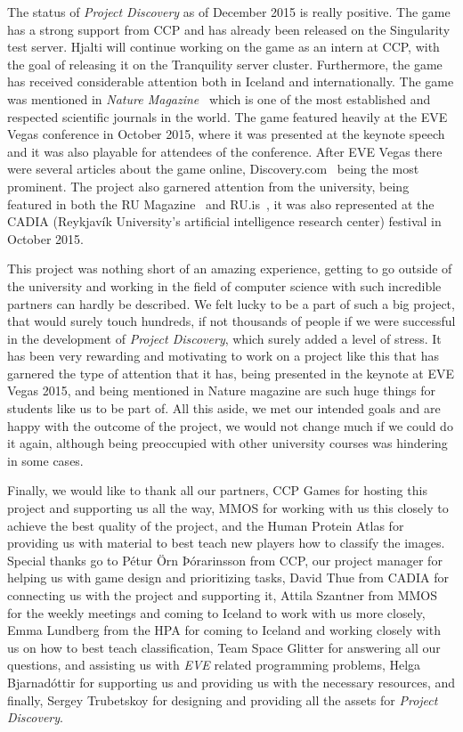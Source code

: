 The status of \emph{Project Discovery} as of December 2015 is really positive. The game has a strong support from CCP and has already been released on the Singularity test server. Hjalti will continue working on the game as an intern at CCP, with the goal of releasing it on the Tranquility server cluster. Furthermore, the game has received considerable attention both in Iceland and internationally. The game was mentioned in \emph{Nature Magazine}~\cite{nature} which is one of the most established and respected scientific journals in the world. The game featured heavily at the EVE Vegas conference in October 2015, where it was presented at the keynote speech and it was also playable for attendees of the conference. After EVE Vegas there were several articles about the game online, Discovery.com~\cite{discovery} being the most prominent. The project also garnered attention from the university, being featured in both the RU Magazine~\cite{rumag} and RU.is~\cite{ruis}, it was also represented at the CADIA (Reykjavík University's artificial intelligence research center) festival in October 2015. 

This project was nothing short of an amazing experience, getting to go outside of the university and working in the field of computer science with such incredible partners can hardly be described. We felt lucky to be a part of such a big project, that would surely touch hundreds, if not thousands of people if we were successful in the development of \emph{Project Discovery}, which surely added a level of stress. It has been very rewarding and motivating to work on a project like this that has garnered the type of attention that it has, being presented in the keynote at EVE Vegas 2015, and being mentioned in Nature magazine are such huge things for students like us to be part of. All this aside, we met our intended goals and are happy with the outcome of the project, we would not change much if we could do it again, although being preoccupied with other university courses was hindering in some cases.

Finally, we would like to thank all our partners, CCP Games for hosting this project and supporting us all the way, MMOS for working with us this closely to achieve the best quality of the project, and the Human Protein Atlas for providing us with material to best teach new players how to classify the images. Special thanks go to Pétur Örn Þórarinsson from CCP, our project manager for helping us with game design and prioritizing tasks, David Thue from CADIA for connecting us with the project and supporting it, Attila Szantner from MMOS for the weekly meetings and coming to Iceland to work with us more closely, Emma Lundberg from the HPA for coming to Iceland and working closely with us on how to best teach classification, Team Space Glitter for answering all our questions, and assisting us with \emph{EVE} related programming problems, Helga Bjarnadóttir for supporting us and providing us with the necessary resources, and finally, Sergey Trubetskoy for designing and providing all the assets for \emph{Project Discovery}.

